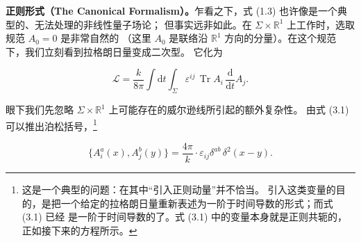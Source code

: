 \documentclass[11pt,a4paper]{article}
\DeclareMathOperator{\Tr}{Tr}
\begin{document}
\textbf{正则形式（The Canonical Formalism）。}乍看之下，式 (1.3) 也许像是一个典型的、无法处理的非线性量子场论；
但事实远非如此。在 $\Sigma\times\mathbb{R}^1$ 上工作时，选取规范 $A_0=0$ 是非常自然的
（这里 $A_0$ 是联络沿 $\mathbb{R}^1$ 方向的分量）。在这个规范下，我们立刻看到拉格朗日量变成二次型。
它化为

\begin{equation}
    \mathcal{L} = \frac{k}{8\pi}\int \mathrm{d}t \int_{\Sigma} \varepsilon^{ij}\,\Tr A_i\,\frac{\mathrm{d}}{\mathrm{d}t}A_j .
    \tag{3.1}
\end{equation}


眼下我们先忽略 $\Sigma\times\mathbb{R}^1$ 上可能存在的威尔逊线所引起的额外复杂性。
由式 (3.1) 可以推出泊松括号，\footnote{这是一个典型的问题：在其中“引入正则动量”并不恰当。
引入这类变量的目的，是把一个给定的拉格朗日量重新表述为一阶于时间导数的形式；而式 (3.1) 已经
是一阶于时间导数的了。式 (3.1) 中的变量本身就是正则共轭的，正如接下来的方程所示。}

\begin{equation}
    \{A_i^a(x), A_j^b(y)\} = \frac{4\pi}{k}\cdot\varepsilon_{ij}\delta^{ab}\,\delta^2(x-y).
    \tag{3.2}
\end{equation}

\end{document}
